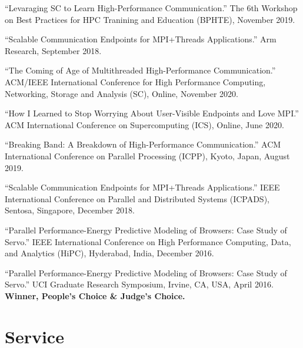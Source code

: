 \documentclass[11pt,article,oneside]{memoir}
\begin{document}
\ind ``Levaraging SC to Learn High-Performance Communication.'' The 6th Workshop on Best Practices for HPC Tranining and Education (BPHTE), November 2019.
\vspace{0.01in}

\ind ``Scalable Communication Endpoints for MPI+Threads Applications.'' Arm Research, September 2018.

\medskip

\ind ``The Coming of Age of Multithreaded High-Performance Communication.'' ACM/IEEE International Conference for High Performance Computing, Networking, Storage and Analysis (SC), Online, November 2020.
\vspace{0.01in}

\ind ``How I Learned to Stop Worrying About User-Visible Endpoints and Love MPI.'' ACM International Conference on Supercomputing (ICS), Online, June 2020.
\vspace{0.01in}

\ind ``Breaking Band: A Breakdown of High-Performance Communication.'' ACM International Conference on Parallel Processing (ICPP), Kyoto, Japan, August 2019. 
 
\ind ``Scalable Communication Endpoints for MPI+Threads Applications.'' IEEE International Conference on Parallel and Distributed Systems (ICPADS), Sentosa, Singapore, December 2018. 
\vspace{0.01in}

\ind ``Parallel Performance-Energy Predictive Modeling of Browsers: Case Study of Servo.'' IEEE International Conference on High Performance Computing, Data, and Analytics (HiPC), Hyderabad, India, December 2016. 


\medskip

\ind ``Parallel Performance-Energy Predictive Modeling of Browsers: Case Study of Servo.'' UCI Graduate Research Symposium, Irvine, CA, USA, April 2016. \textbf{\textcolor{nice-purple}{Winner, People's Choice \& Judge's Choice.}}


\bigskip

\section{Service}

\medskip
\end{document}
